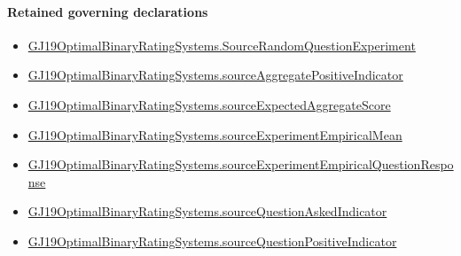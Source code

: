 \documentclass[10pt]{article}
\begin{document}
\paragraph{Retained governing declarations}
\begin{itemize}\raggedright
\item \hyperlink{paper-prerequisite-7a235f61a510cc28}{GJ19\allowbreak{}Optimal\allowbreak{}Binary\allowbreak{}Rating\allowbreak{}Systems.\allowbreak{}Source\allowbreak{}Random\allowbreak{}Question\allowbreak{}Experiment}
\item \hyperlink{governing-declaration-ce3f0863fc180f8d}{GJ19\allowbreak{}Optimal\allowbreak{}Binary\allowbreak{}Rating\allowbreak{}Systems.\allowbreak{}source\allowbreak{}Aggregate\allowbreak{}Positive\allowbreak{}Indicator}
\item \hyperlink{governing-declaration-59f0493d3776e0c7}{GJ19\allowbreak{}Optimal\allowbreak{}Binary\allowbreak{}Rating\allowbreak{}Systems.\allowbreak{}source\allowbreak{}Expected\allowbreak{}Aggregate\allowbreak{}Score}
\item \hyperlink{governing-declaration-407bb01e232645a7}{GJ19\allowbreak{}Optimal\allowbreak{}Binary\allowbreak{}Rating\allowbreak{}Systems.\allowbreak{}source\allowbreak{}Experiment\allowbreak{}Empirical\allowbreak{}Mean}
\item \hyperlink{paper-prerequisite-bb12d1c548870615}{GJ19\allowbreak{}Optimal\allowbreak{}Binary\allowbreak{}Rating\allowbreak{}Systems.\allowbreak{}source\allowbreak{}Experiment\allowbreak{}Empirical\allowbreak{}Question\allowbreak{}Response}
\item \hyperlink{governing-declaration-756fc6d8eb1da5bb}{GJ19\allowbreak{}Optimal\allowbreak{}Binary\allowbreak{}Rating\allowbreak{}Systems.\allowbreak{}source\allowbreak{}Question\allowbreak{}Asked\allowbreak{}Indicator}
\item \hyperlink{governing-declaration-ec4f87fcd48c433f}{GJ19\allowbreak{}Optimal\allowbreak{}Binary\allowbreak{}Rating\allowbreak{}Systems.\allowbreak{}source\allowbreak{}Question\allowbreak{}Positive\allowbreak{}Indicator}
\end{itemize}
\end{document}
